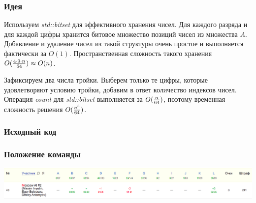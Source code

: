 
\subsubsection*{Идея}
Используем \textit{std::bitset} для эффективного хранения чисел. Для каждого разряда и для каждой цифры хранится битовое множество позиций чисел из множества $A$. Добавление и удаление чисел из такой структуры очень простое и выполняется фактически за $O(1)$. Пространственная сложность такого хранения $O({{4 \cdot 9 \cdot n}\over{64}}) \approx O(n)$.

Зафиксируем два числа тройки. Выберем только те цифры, которые удовлетворяют условию тройки, добавим в ответ количество индексов чисел. Операция \textit{count} для \textit{std::bitset} выполняется за $O({n \over 64})$, поэтому временная сложность решения $O({{n ^ 3} \over 64})$.
\subsubsection*{Исходный код}

\subsubsection*{Положение команды}
\includegraphics[scale=0.25]{images/mw4.png}\newline\noindent
\pagebreak


